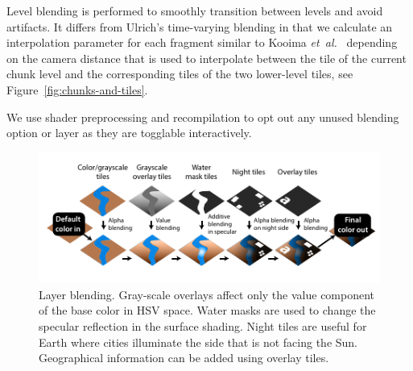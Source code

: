 \documentclass[journal]{vgtc}                %
\newcommand{\etal}{\emph{et~al.}}
\begin{document}
Level blending is performed to smoothly transition between levels and avoid artifacts. It differs from Ulrich's time-varying blending \cite{ulrich2002rendering} in that we calculate an interpolation parameter for each fragment similar to Kooima \etal ~\cite{kooima2009planetary} depending on the camera distance that is used to interpolate between the tile of the current chunk level and the corresponding tiles of the two lower-level tiles, see Figure~\ref{fig:chunks-and-tiles}.

We use shader preprocessing and recompilation to opt out any unused blending option or layer as they are togglable interactively.

\begin{figure}[t]
  \centering
    \includegraphics[width=1.0\linewidth]{figures/fragment-blending.pdf}
  \caption{Layer blending. Gray-scale overlays affect only the value component of the base color in HSV space. Water masks are used to change the specular reflection in the surface shading. Night tiles are useful for Earth where cities illuminate the side that is not facing the Sun. Geographical information can be added using overlay tiles.}
  \label{fig:fragpipe}\vspace{-4mm}
\end{figure}

\iffalse
\end{document}

